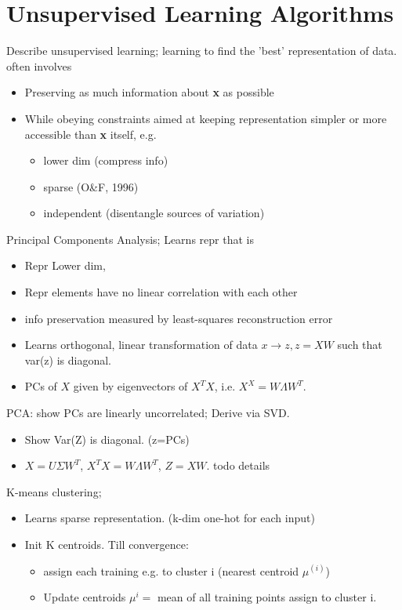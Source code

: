 \documentclass{article}
\begin{document}
\section{Unsupervised Learning Algorithms}

Describe unsupervised learning; learning to find the 'best' representation of data. often involves \begin{itemize} \item Preserving as much information about \textbf{x} as possible \item While obeying constraints aimed at keeping representation simpler or more accessible than \textbf{x} itself, e.g.  \begin{itemize} \item lower dim (compress info) \item sparse (O\&F, 1996) \item independent (disentangle sources of variation) \end{itemize} \end{itemize}

Principal Components Analysis; Learns repr that is \begin{itemize} \item Repr Lower dim, \item Repr elements have no linear correlation with each other \item info preservation measured by least-squares reconstruction error \item Learns orthogonal, linear transformation of data $x\to z, z=XW$ such that var(z) is diagonal.  \item PCs of $X$ given by eigenvectors of $X^TX$, i.e. $X^X=W\Lambda W^T$.  \end{itemize}

PCA: show PCs are linearly uncorrelated; Derive via SVD. \begin{itemize} \item Show Var(Z) is diagonal. (z=PCs) \item $X = U\Sigma W^T$, $X^TX = W\Lambda W^T$, $Z=XW$. todo details \end{itemize}

K-means clustering; \begin{itemize} \item Learns sparse representation. (k-dim one-hot for each input) \item Init K centroids. Till convergence: \begin{itemize} \item assign each training e.g. to cluster i (nearest centroid $\mu^{(i)}$) \item Update centroids $\mu^{i}=$ mean of all training points assign to cluster i.  \end{itemize} \end{itemize}
\end{document}
